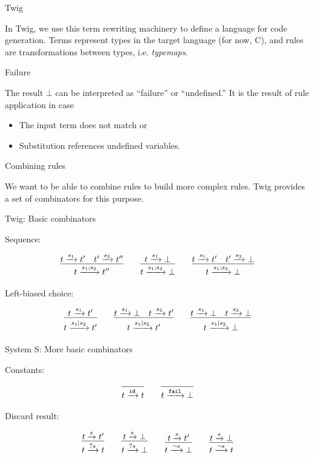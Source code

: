 \documentclass{beamer}
\newcommand{\arr}[1]{\ensuremath\xrightarrow{#1}}
\begin{document}
\begin{frame}{Twig}

In Twig, we use this term rewriting machinery to define a language for code
generation. Terms represent types in the target language (for now, C), and
rules are transformations between types, i.e. \emph{typemaps}.

\end{frame}


\begin{frame}{Failure}

The result $\bot$ can be interpreted as ``failure'' or ``undefined.'' It is
the result of rule application in case

\begin{itemize}
  \item The input term does not match or
  \item Substitution references undefined variables.
\end{itemize}

\end{frame}


\begin{frame}{Combining rules}

We want to be able to combine rules to build more complex rules. Twig provides
a set of combinators for this purpose.

\end{frame}


\begin{frame}{Twig: Basic combinators}

Sequence:

\[
\infer{t \arr{s_1;s_2} t''}{t \arr{s_1} t' \quad t' \arr{s_2} t''}
\qquad 
\infer{t \arr{s_1;s_2} \bot}{t \arr{s_1} \bot}
\qquad
\infer{t \arr{s_1;s_2} \bot}{t \arr{s_1} t' \quad t' \arr{s_2} \bot}
\]

Left-biased choice:

\[
\infer{t \arr{s_1|s_2} t'}{t \arr{s_1} t'}
\qquad 
\infer{t \arr{s_1|s_2} t'}{t \arr{s_1} \bot \quad t \arr{s_2} t'}
\qquad
\infer{t \arr{s_1|s_2} \bot}{t \arr{s_1} \bot \quad t \arr{s_2} \bot}
\]

\end{frame}


\begin{frame}{System S: More basic combinators}

Constants:

\[
\infer{t \arr{\mathtt{id}} t}{}
\qquad
\infer{t \arr{\mathtt{fail}} \bot}{}
\]

Discard result:

\[
\infer{t \arr{?s} t}{t \arr{s} t'}
\qquad 
\infer{t \arr{?s} \bot}{t \arr{s} \bot}
\qquad
\infer{t \arr{\lnot s} \bot}{t \arr{s} t'}
\qquad 
\infer{t \arr{\lnot s} t}{t \arr{s} \bot}
\]

\end{frame}
\end{document}
